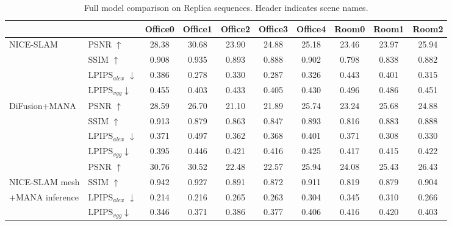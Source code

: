 \begin{table*}[t] %
  \caption {Full model comparison on Replica sequences. Header indicates scene names.} 
	\begin{adjustwidth}{0pt}{0pt}  
		\centering
		{\small
			\begin{tabular}{|ll|c|c|c|c|c|c|c|c|}
				\hline
				&& {Office0} & {Office1}  &{Office2} &{Office3} &{Office4} &{Room0} &{Room1} &{Room2}              \\
				
				\hline\hline
				\multirow{4}{*}{NICE-SLAM~\cite{zhu2022nice}} &
				PSNR $\uparrow$ 
				&28.38&30.68&23.90&24.88&25.18&23.46&23.97&25.94\\
				
				&SSIM $\uparrow$  &0.908&0.935&0.893&0.888&0.902&0.798&0.838&0.882 \\ 
				&LPIPS$_{alex}$ $\downarrow$ &0.386&0.278&0.330&0.287&0.326&0.443&0.401&0.315\\
				&LPIPS$_{vgg}$$ \downarrow$ &0.455&0.403&0.433&0.405&0.430&0.496&0.486&0.451
				\\
				\hline 

				\multirow{4}{*}{DiFusion\cite{huang2021di}+MANA} &
				PSNR $\uparrow$ 
				&28.59&26.70&21.10&21.89&25.74&23.24 &25.68&24.88\\
				&SSIM $\uparrow$  &0.913 &0.879&0.863&0.847&0.893&0.816&0.883&0.888 \\ 
				&LPIPS$_{alex}$ $\downarrow$ &0.371 &0.497&0.362&0.368&0.401&0.371&0.308&0.330\\
				&LPIPS$_{vgg}$$ \downarrow$ &0.395 &0.446&0.421&0.416&0.425&0.417&0.415&0.422\\				
				\hline
				
				&PSNR $\uparrow$ &30.76&30.52&22.48 &22.57 &25.94 &24.08&25.43&26.43\\

				NICE-SLAM mesh
				&SSIM $\uparrow$ & 0.942&0.927&0.891&0.872&0.911&0.819&0.879 &0.904\\


				+MANA inference
				&LPIPS$_{alex}$ $\downarrow$ &0.214&0.216&0.265&0.263&0.304&0.345&0.310&0.266\\ 

				&LPIPS$_{vgg}$$ \downarrow$ & 0.346 &0.371&0.386&0.377 & 0.406&0.416&0.420&0.403
				\\
				\hline
				
			\end{tabular} 
		}
		\label{tab:comp_rep}
	\end{adjustwidth}
\vspace{-3mm}
\end{table*}





